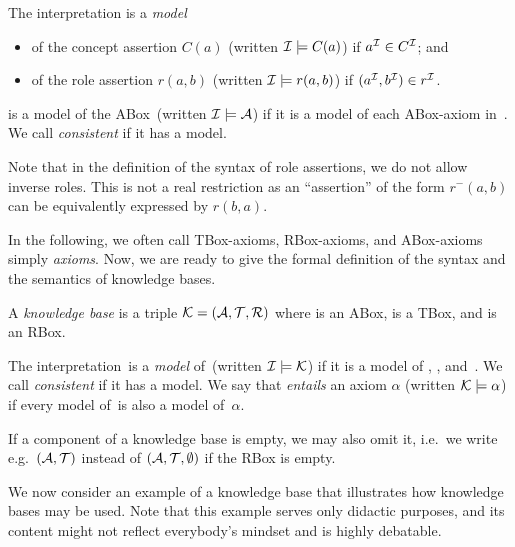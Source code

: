 \begin{definition}\label{def:semantics-abox}
    The interpretation \Imc is a \emph{model}
    \begin{itemize}
        \item of the concept assertion $C(a)$ (written $\mathcal{I}\models
            C(a)$) if $a^\mathcal{I}\in C^\mathcal{I}$; and
        \item of the role assertion $r(a,b)$ (written $\mathcal{I}\models
            r(a,b)$) if $(a^\mathcal{I},b^\mathcal{I})\in r^\mathcal{I}$.
    \end{itemize}
    \Imc is a model of the ABox~\Amc (written $\mathcal{I}\models\mathcal{A}$) if it is a
    model of each ABox-axiom in~\Amc.
    We call \Amc \emph{consistent} if it has a model.
\end{definition}

\noindent
Note that in the definition of the syntax of role assertions, we do not allow
inverse roles.  This is not a real restriction as an \enquote{assertion} of
the form $r^-(a,b)$ can be equivalently expressed by $r(b,a)$.

In the following, we often call TBox-axioms, RBox-axioms, and ABox-axioms
simply \emph{axioms}.  Now, we are ready to give the formal definition of the
syntax and the semantics of knowledge bases.

\begin{definition}\label{def:kb}
    A \emph{knowledge base} is a triple $\mathcal{K}=(\mathcal{A},\mathcal{T},\mathcal{R})$
    where \Amc is an ABox, \Tmc is a TBox, and \Rmc is an RBox.

    The interpretation~\Imc is a \emph{model} of~\Kmc (written
    $\mathcal{I}\models\mathcal{K}$) if it is a model of \Amc, \Tmc, and~\Rmc.
    We call \Kmc \emph{consistent} if it has a model.
    We say that \Kmc \emph{entails} an axiom $\alpha$ (written
    $\mathcal{K}\models\alpha$) if every model of~\Kmc is also a model of~$\alpha$.
\end{definition}

\noindent
If a component of a knowledge base is empty, we may also omit it, i.e.~we write
e.g.\ $(\mathcal{A},\mathcal{T})$ instead of $(\mathcal{A},\mathcal{T},\emptyset)$
if the RBox is empty.

We now consider an example of a knowledge base that illustrates how knowledge
bases may be used.  Note that this example serves only
didactic purposes, and its content might not reflect everybody's mindset and is
highly debatable.

